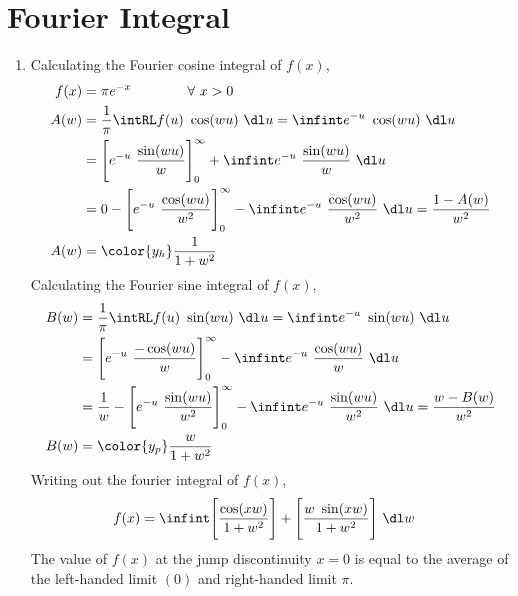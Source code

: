 \section{Fourier Integral}

\begin{enumerate}
    \item Calculating the Fourier cosine integral of $ f(x) $,
          \begin{align}
              f(x) & = \pi e^{-x} \qquad\qquad \forall\ x > 0                \\
              A(w) & = \frac{1}{\pi} \intRL f(u)\ \cos(wu)\ \dl u
              = \infint e^{-u}\ \cos(wu)\ \dl u                              \\
                   & = \Bigg[e^{-u}\ \frac{\sin(wu)}{w} \Bigg]_{0}^{\infty}
              + \infint e^{-u}\ \frac{\sin(wu)}{w}\ \dl u                    \\
                   & = 0 - \Bigg[e^{-u}\ \frac{\cos(wu)}{w^2}\Bigg]_0^\infty
              - \infint e^{-u}\ \frac{\cos(wu)}{w^2}\ \dl u
              = \frac{1 - A(w)}{w^2}                                         \\
              A(w) & = \color{y_h} \frac{1}{1 + w^2}
          \end{align}
          Calculating the Fourier sine integral of $ f(x) $,
          \begin{align}
              B(w) & = \frac{1}{\pi} \intRL f(u)\ \sin(wu)\ \dl u
              = \infint e^{-u}\ \sin(wu)\ \dl u                              \\
                   & = \Bigg[e^{-u}\ \frac{-\cos(wu)}{w} \Bigg]_{0}^{\infty}
              - \infint e^{-u}\ \frac{\cos(wu)}{w}\ \dl u                    \\
                   & = \frac{1}{w} - \Bigg[e^{-u}\ \frac{\sin(wu)}{w^2}
                  \Bigg]_0^\infty
              - \infint e^{-u}\ \frac{\sin(wu)}{w^2}\ \dl u
              = \frac{w - B(w)}{w^2}                                         \\
              B(w) & = \color{y_p} \frac{w}{1 + w^2}
          \end{align}
          Writing out the fourier integral of $ f(x) $,
          \begin{align}
              f(x) & = \infint \Bigg[ \frac{\cos(x w)}{1 + w^2} \Bigg]
              + \Bigg[ \frac{w\ \sin(x w)}{1 + w^2} \Bigg]\ \dl w
          \end{align}
          The value of $ f(x) $ at the jump discontinuity $ x = 0 $ is equal to the
          average of the left-handed limit $ (0) $ and right-handed limit $ \pi $.


\end{enumerate}

